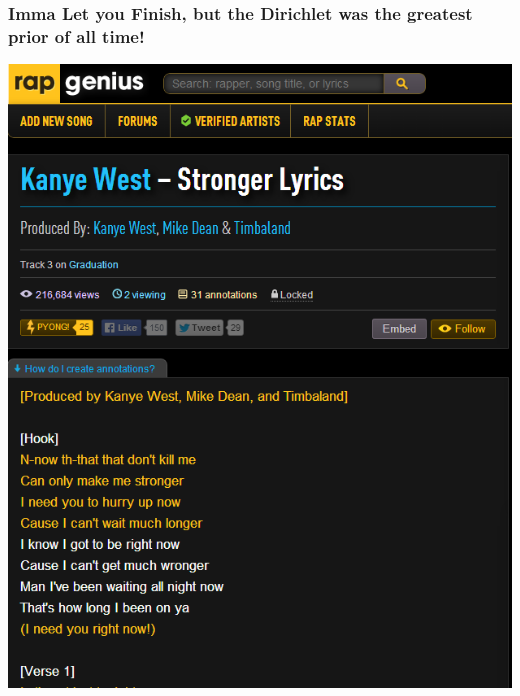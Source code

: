 \documentclass{beamer}
\begin{document}
\begin{frame}
\frametitle{Imma Let you Finish, but the Dirichlet was the greatest prior of all time!}
\pause
\begin{center}
\includegraphics[height=1.0\textheight]{Images/lyrics_sample.png}
\end{center}
\end{frame}
\end{document}

